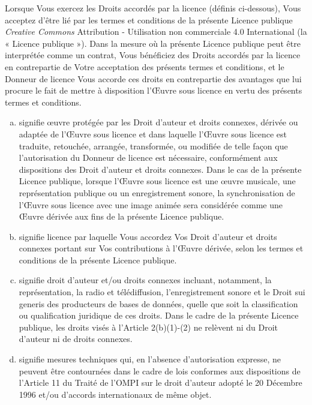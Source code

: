 Lorsque Vous exercez les Droits accordés par la licence (définis ci-dessous), Vous acceptez d'être lié par les termes et conditions de la présente Licence publique \textit{Creative Commons} Attribution - Utilisation non commerciale 4.0 International (la « Licence publique »). Dans la mesure où la présente Licence publique peut être interprétée comme un contrat, Vous bénéficiez des Droits accordés par la licence en contrepartie de Votre acceptation des présents termes et conditions, et le Donneur de licence Vous accorde ces droits en contrepartie des avantages que lui procure le fait de mettre à disposition l’Œuvre sous licence en vertu des présents termes et conditions. 


\begin{enumerate}[a.]
\item {} signifie œuvre protégée par les Droit d’auteur et droits connexes, dérivée ou adaptée de l’Œuvre sous licence et dans laquelle l’Œuvre sous licence est traduite, retouchée, arrangée, transformée, ou modifiée de telle façon que l’autorisation du Donneur de licence est nécessaire, conformément aux dispositions des Droit d’auteur et droits connexes. Dans le cas de la présente Licence publique, lorsque l’Œuvre sous licence est une œuvre musicale, une représentation publique ou un enregistrement sonore, la synchronisation de l'Œuvre sous licence avec une image animée sera considérée comme une Œuvre dérivée aux fins de la présente Licence publique.
\item {} signifie licence par laquelle Vous accordez Vos Droit d'auteur et droits connexes portant sur Vos contributions à l'Œuvre dérivée, selon les termes et conditions de la présente Licence publique.
\item {} signifie droit d’auteur et/ou droits connexes incluant, notamment, la représentation, la radio et télédiffusion, l’enregistrement sonore et le Droit sui generis des producteurs de bases de données, quelle que soit la classification ou qualification juridique de ces droits. Dans le cadre de la présente Licence publique, les droits visés à l’Article 2(b)(1)-(2) ne relèvent ni du Droit d’auteur ni de droits connexes.
\item {} signifie mesures techniques qui, en l’absence d’autorisation expresse, ne peuvent être contournées dans le cadre de lois conformes aux dispositions de l’Article 11 du Traité de l’OMPI sur le droit d’auteur adopté le 20 Décembre 1996 et/ou d’accords internationaux de même objet.

\end{enumerate}
